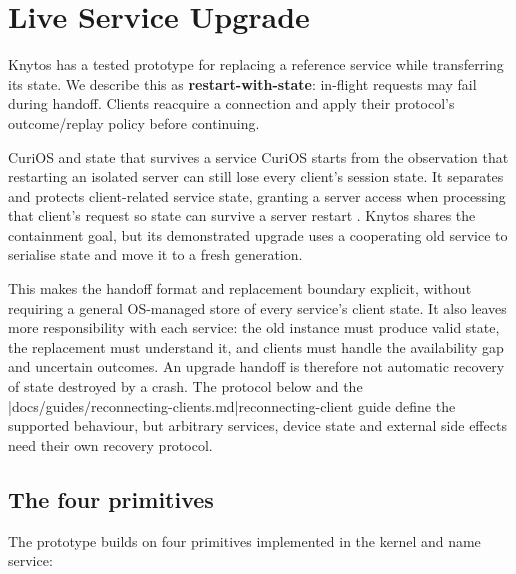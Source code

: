 \chapter{Live Service Upgrade}
\label{chap:live-upgrade}

Knytos has a tested prototype for replacing a reference service while
transferring its state. We describe this as \textbf{restart-with-state}:
in-flight requests may fail during handoff. Clients reacquire a connection and
apply their protocol's outcome/replay policy before continuing.

\begin{architecturalcomparison}{CuriOS and state that survives a service}
CuriOS starts from the observation that restarting an isolated server can
still lose every client's session state. It separates and protects
client-related service state, granting a server access when processing that
client's request so state can survive a server restart \cite{prior:curios}.
Knytos shares the containment goal, but its demonstrated upgrade uses a
cooperating old service to serialise state and move it to a fresh generation.

This makes the handoff format and replacement boundary explicit, without
requiring a general OS-managed store of every service's client state. It also
leaves more responsibility with each service: the old instance must produce
valid state, the replacement must understand it, and clients must handle the
availability gap and uncertain outcomes. An upgrade handoff is therefore not
automatic recovery of state destroyed by a crash. The protocol below and the
\repofiletext|docs/guides/reconnecting-clients.md|{reconnecting-client guide}
define the supported behaviour, but arbitrary services, device state and external
side effects need their own recovery protocol.
\end{architecturalcomparison}

\section{The four primitives}

The prototype builds on four primitives implemented in the kernel and name
service:

